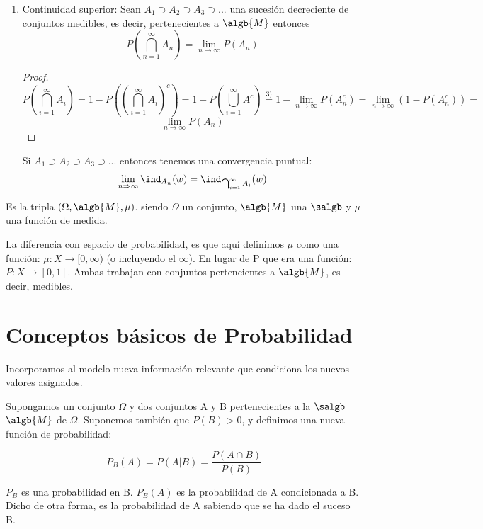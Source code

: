 \documentclass{apuntes}
\begin{document}
\begin{enumerate}
\item Continuidad superior: Sean $A_1 \supset A_2 \supset A_3 \supset ...$ una sucesión decreciente de conjuntos medibles, es decir, pertenecientes a $\algb{M}$ entonces
\[ P(\bigcap_{n=1}^{\infty}A_n) = \lim_{n \rightarrow \infty} P(A_n)
\]

\begin{proof}
\[P(\bigcap_{i=1}^{\infty}A_i) = 1-P\left((\bigcap_{i=1}^{\infty}A_i)^c\right)=1-P(\bigcup_{i=1}^{\infty}A^c) \stackrel{3)}{=} 1-\lim_{n \rightarrow \infty}P(A_n^c)=\lim_{n \rightarrow \infty}(1-P(A_n^c)) =
\]
\[
\lim_{n \rightarrow \infty}P(A_n)
\]
\end{proof}

\obs Si $A_1 \supset A_2 \supset A_3 \supset...$ entonces tenemos una convergencia puntual:
\[
\lim_{n \Rightarrow \infty}\ind_{A_n}(w) = \ind_{\bigcap_{i=1}^{\infty}A_i}(w)
\]
\end{enumerate}


\begin{defn}
 Es la tripla $(\Omega, \algb{M}, \mu)$. siendo $\Omega$ un conjunto, $\algb{M}$ una $\salgb$ y $\mu$ una función de medida.
\end{defn}

La diferencia con espacio de probabilidad, es que aquí definimos $\mu$ como una función: $\mu: X \rightarrow [0,\infty)$  (o incluyendo el $\infty$). En lugar de P que era una función: $P: X \rightarrow [0,1]$. Ambas trabajan con conjuntos pertencientes a $\algb{M}$, es decir, medibles.


\section{Conceptos básicos de Probabilidad}
Incorporamos al modelo nueva información relevante que condiciona los nuevos valores asignados.

\begin{defn}
Supongamos un conjunto $\Omega$ y dos conjuntos A y B pertenecientes a la $\salgb$ $\algb{M}$ de $\Omega$. Suponemos también que $P(B)>0$, y definimos una nueva función de probabilidad:

\[ P_B(A) = P(A | B) = \frac{P(A \cap B)}{P(B)}\]

$P_B$ es una probabilidad en B. $P_B(A)$ es la probabilidad de A condicionada a B. Dicho de otra forma, es la probabilidad de A sabiendo que se ha dado el suceso B.
\end{defn}
\end{document}
